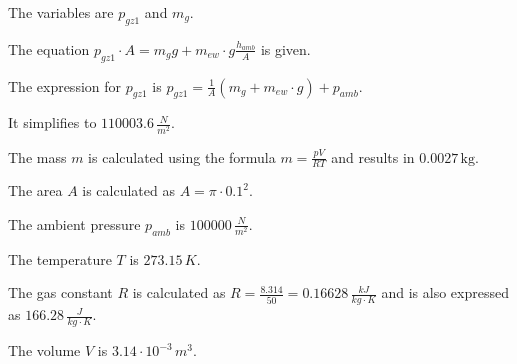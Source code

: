 The variables are \( p_{gz1} \) and \( m_g \).

The equation \( p_{gz1} \cdot A = m_g g + m_{ew} \cdot g \frac{h_{amb}}{A} \) is given.

The expression for \( p_{gz1} \) is \( p_{gz1} = \frac{1}{A} (m_g + m_{ew} \cdot g) + p_{amb} \).

It simplifies to \( 110003.6 \, \frac{N}{m^2} \).

The mass \( m \) is calculated using the formula \( m = \frac{p V}{R T} \) and results in \( 0.0027 \, \text{kg} \).

The area \( A \) is calculated as \( A = \pi \cdot 0.1^2 \).

The ambient pressure \( p_{amb} \) is \( 100000 \, \frac{N}{m^2} \).

The temperature \( T \) is \( 273.15 \, K \).

The gas constant \( R \) is calculated as \( R = \frac{8.314}{50} = 0.16628 \, \frac{kJ}{kg \cdot K} \) and is also expressed as \( 166.28 \, \frac{J}{kg \cdot K} \).

The volume \( V \) is \( 3.14 \cdot 10^{-3} \, m^3 \).